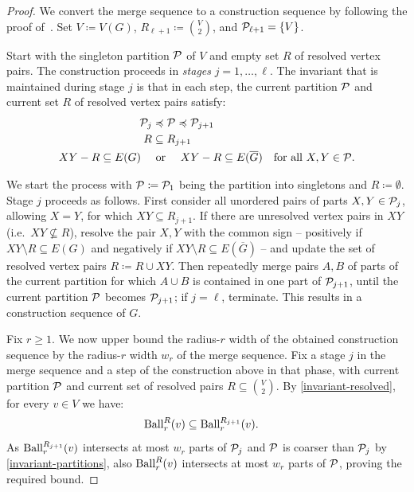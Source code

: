 \begin{proof}
We convert the merge sequence to a construction sequence by following the proof of~\cite[Lemma~3.3]{mw-arxiv}. Set $V\coloneqq V(G)$, $R_{\ell+1}\coloneqq \binom{V}{2}$, and $\mathcal P_{\ell+1}=\{V\}$.


Start with the singleton partition $\mathcal P$ of $V$ and empty set $R$ of resolved vertex pairs.
The construction proceeds in \emph{stages} $j=1,\ldots,\ell$.
The invariant that is maintained during stage $j$ is that in each step, the current partition $\mathcal P$ and current set $R$ of resolved vertex pairs satisfy:
\begin{align}\label{invariant-partitions}
    \mathcal P_j&\preccurlyeq \mathcal P\preccurlyeq \mathcal P_{j+1}\qquad\\ R&\subseteq R_{j+1}\label{invariant-resolved}\\
    XY- R\subseteq E(G)\quad&\text{ or }\quad XY- R\subseteq E(\overline G)\quad\text{for all $X,Y\in \mathcal P$}.
\end{align}

We start the process with $\mathcal P \coloneqq \mathcal P_1$ being the partition into singletons and $R \coloneqq \emptyset$.
Stage
$j$ proceeds as follows. First consider all unordered pairs of parts
$X,Y\in\mathcal P_{j}$, allowing $X=Y$, for which
$XY\subseteq R_{j+1}$.
If there are unresolved vertex pairs in $XY$ (i.e.\ $XY\nsubseteq R$), resolve the pair $X,Y$
with the common sign -- positively if $XY\setminus R\subseteq E(G)$ and negatively if $XY\setminus R\subseteq E(\overline G)$ -- and update the set of resolved vertex pairs $R\coloneqq R\cup XY$.
Then repeatedly merge pairs $A,B$ of parts of the current partition for which $A\cup B$ is contained in one part of $\mathcal P_{j+1}$, until the current partition $\mathcal P$ becomes $\mathcal P_{j+1}$; if $j=\ell$, terminate. This results in a construction sequence of $G$.


Fix $r\geq 1$.
We now upper bound the radius-$r$ width of the obtained construction sequence by the radius-$r$ width $w_r$ of the merge sequence.
Fix a stage $j$ in the merge sequence and a step 
of the construction above in that phase, with current partition $\mathcal P$ and current set of resolved pairs $R\subseteq \binom{V}{2}$. By \eqref{invariant-resolved}, for every $v\in V$ we have:
\begin{align}\label{ball-inc}
    \operatorname{Ball}_r^{R}(v)&\subseteq \operatorname{Ball}_r^{R_{j+1}}(v).
\end{align}
As $\operatorname{Ball}_r^{R_{j+1}}(v)$ intersects at most $w_r$ parts of $\mathcal P_j$ and $\mathcal P$ is coarser than $\mathcal P_j$ by \eqref{invariant-partitions},
also $\operatorname{Ball}_r^{R}(v)$ intersects at most $w_r$ parts of $\mathcal P$, proving the required bound.



\end{proof}
